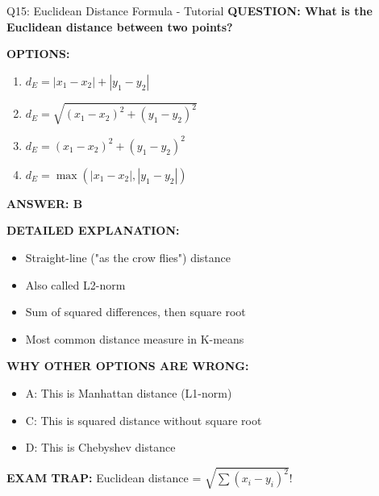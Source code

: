 \documentclass[8pt]{beamer}
\begin{document}
	\begin{frame}{Q15: Euclidean Distance Formula - Tutorial}
		\fontsize{6.5}{7.5}\selectfont
		\textbf{QUESTION: What is the Euclidean distance between two points?}
		
		\vspace{0.1cm}
		\textbf{OPTIONS:}
		\begin{enumerate}
			\item $d_E = |x_1 - x_2| + |y_1 - y_2|$
			\item $d_E = \sqrt{(x_1 - x_2)^2 + (y_1 - y_2)^2}$
			\item $d_E = (x_1 - x_2)^2 + (y_1 - y_2)^2$
			\item $d_E = \max(|x_1 - x_2|, |y_1 - y_2|)$
		\end{enumerate}
		
		\vspace{0.1cm}
		\textcolor{myblue}{\textbf{ANSWER: B}}
		
		\vspace{0.1cm}
		\textbf{DETAILED EXPLANATION:}
		\begin{itemize}
			\item Straight-line ("as the crow flies") distance
			\item Also called L2-norm
			\item Sum of squared differences, then square root
			\item Most common distance measure in K-means
		\end{itemize}
		
		\vspace{0.1cm}
		\textcolor{myred}{\textbf{WHY OTHER OPTIONS ARE WRONG:}}
		\begin{itemize}
			\item \textcolor{myred}{A:} This is Manhattan distance (L1-norm)
			\item \textcolor{myred}{C:} This is squared distance without square root
			\item \textcolor{myred}{D:} This is Chebyshev distance
		\end{itemize}
		
		\textcolor{myred}{\textbf{EXAM TRAP:}} Euclidean distance = \textcolor{myblue}{$\sqrt{\sum (x_i - y_i)^2}$}!
	\end{frame}
	
\end{document}

